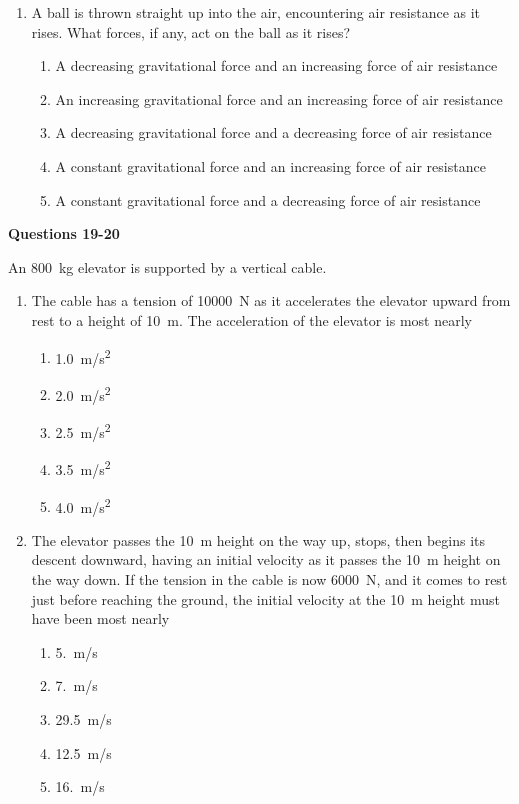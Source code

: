 \documentclass{../../oss-apphys}
\begin{document}
\begin{multicols}{2}
\begin{enumerate}[resume,leftmargin=18pt]
  \item A ball is thrown straight up into the air, encountering air resistance
    as it rises. What forces, if any, act on the ball as it rises?
    \begin{enumerate}[noitemsep,topsep=0pt,leftmargin=18pt,label=(\Alph*)]
    \item A decreasing gravitational force and an increasing force of air
      resistance
    \item An increasing gravitational force and an increasing force of air
      resistance
    \item A decreasing gravitational force and a decreasing force of air
      resistance
    \item A constant gravitational force and an increasing force of air
      resistance
    \item A constant gravitational force and a decreasing force of air
      resistance
    \end{enumerate}
  \end{enumerate}
  \columnbreak
  
  \textbf{Questions 19-20}

  An \SI{800}{\kilo\gram} elevator is supported by a vertical cable.
  \begin{center}
  \end{center}
  \begin{enumerate}[resume,leftmargin=18pt]
  \item The cable has a tension of \SI{10000}{\newton} as it accelerates the
    elevator upward from rest to a height of \SI{10}{\metre}. The acceleration
    of the elevator is most nearly
    \begin{enumerate}[noitemsep,topsep=0pt,leftmargin=18pt,label=(\Alph*)]
    \item\SI{1.0}{m/s^2}
    \item\SI{2.0}{m/s^2}
    \item\SI{2.5}{m/s^2}
    \item\SI{3.5}{m/s^2}
    \item\SI{4.0}{m/s^2}
    \end{enumerate}
    
  \item The elevator passes the \SI{10}{\metre} height on the way up, stops,
    then begins its descent downward, having an initial velocity as it passes
    the \SI{10}{\metre} height on the way down. If the tension in the cable is
    now \SI{6000}{\newton}, and it comes to rest just before reaching the
    ground, the initial velocity at the \SI{10}{\metre} height must have been
    most nearly
    \begin{enumerate}[noitemsep,topsep=0pt,leftmargin=18pt,label=(\Alph*)]
    \item\SI{5.}{m/s}
    \item\SI{7.}{m/s}
    \item\SI{29.5}{m/s}
    \item\SI{12.5}{m/s}
    \item\SI{16.}{m/s}
    \end{enumerate}


\end{enumerate}
\end{multicols}
\end{document}
